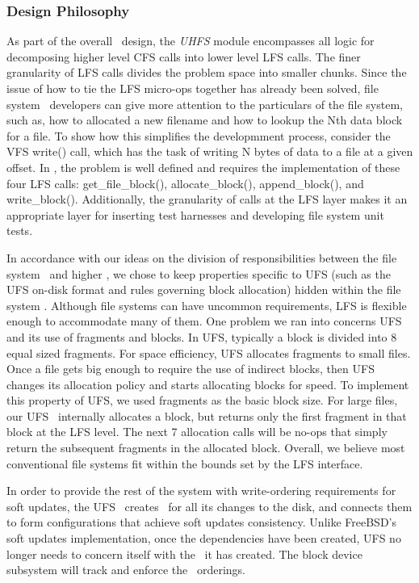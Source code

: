 \subsubsection {Design Philosophy}
As part of the overall \Kudos\ design, the \emph{UHFS} module encompasses all
logic for decomposing higher level CFS calls into lower level LFS calls. The
finer granularity of LFS calls divides the problem space into smaller chunks.
Since the issue of how to tie the LFS micro-ops together has already been
solved, file system \module\ developers can give more attention to the
particulars of the file system, such as, how to allocated a new filename and
how to lookup the Nth data block for a file. To show how this simplifies the
developmment process, consider the VFS write() call, which has the task of
writing N bytes of data to a file at a given offset. In \Kudos, the problem is
well defined and requires the implementation of these four LFS calls:
get\_file\_block(), allocate\_block(), append\_block(), and write\_block().
Additionally, the granularity of calls at the LFS layer makes it an appropriate
layer for inserting test harnesses and developing file system unit tests.

In accordance with our ideas on the division of responsibilities between the
file system \module\ and higher \modules, we chose to keep properties specific
to UFS (such as the UFS on-disk format and rules governing block allocation)
hidden within the file system \module. Although file systems can have uncommon
requirements, LFS is flexible enough to accommodate many of them. One problem
we ran into concerns UFS and its use of fragments and blocks. In UFS, typically
a block is divided into 8 equal sized fragments. For space efficiency, UFS
allocates fragments to small files. Once a file gets big enough to require the
use of indirect blocks, then UFS changes its allocation policy and starts
allocating blocks for speed. To implement this property of UFS, we used
fragments as the basic block size. For large files, our UFS \module\ internally
allocates a block, but returns only the first fragment in that block at the LFS
level. The next 7 allocation calls will be no-ops that simply return the
subsequent fragments in the allocated block. Overall, we believe most
conventional file systems fit within the bounds set by the LFS interface.

In order to provide the rest of the system with write-ordering requirements for
soft updates, the UFS \module\ creates \chdescs\ for all its changes to the
disk, and connects them to form configurations that achieve soft updates
consistency. Unlike FreeBSD's soft updates implementation, once the dependencies
have been created, UFS no longer needs to concern itself with the \chdescs\ it
has created. The block device subsystem will track and enforce the \chdesc\
orderings.

